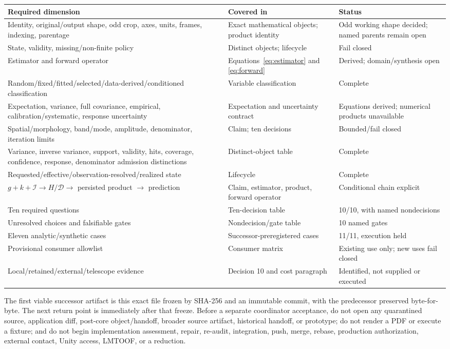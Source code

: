 \documentclass[11pt]{article}
\begin{document}
\begin{longtable}{@{}L{0.34\textwidth}L{0.23\textwidth}L{0.34\textwidth}@{}}
\toprule
Required dimension & Covered in & Status \\
\midrule
\endhead
Identity, original/output shape, odd crop, axes, units, frames, indexing,
parentage & Exact mathematical objects; product identity & Odd working shape
decided; named parents remain open \\
State, validity, missing/non-finite policy & Distinct objects; lifecycle &
Fail closed \\
Estimator and forward operator & Equations~\ref{eq:estimator} and
\ref{eq:forward} & Derived; domain/synthesis open \\
Random/fixed/fitted/selected/data-derived/conditioned classification & Variable
classification & Complete \\
Expectation, variance, full covariance, empirical, calibration/systematic,
response uncertainty & Expectation and uncertainty contract & Equations
derived; numerical products unavailable \\
Spatial/morphology, band/mode, amplitude, denominator, iteration limits & Claim;
ten decisions & Bounded/fail closed \\
Variance, inverse variance, support, validity, hits, coverage, confidence,
response, denominator admission distinctions & Distinct-object table &
Complete \\
Requested/effective/observation-resolved/realized state & Lifecycle & Complete \\
$g+k+\mathcal I\to H/\mathcal D\to$ persisted product $\to$ prediction & Claim,
estimator, product, forward operator & Conditional chain explicit \\
Ten required questions & Ten-decision table & 10/10, with named nondecisions \\
Unresolved choices and falsifiable gates & Nondecision/gate table & 10 named gates \\
Eleven analytic/synthetic cases & Successor-preregistered cases & 11/11,
execution held \\
Provisional consumer allowlist & Consumer matrix & Existing use only; new uses
fail closed \\
Local/retained/external/telescope evidence & Decision 10 and cost paragraph &
Identified, not supplied or executed \\
\bottomrule
\end{longtable}

The first viable successor artifact is this exact file frozen by SHA-256 and an
immutable commit, with the predecessor preserved byte-for-byte.  The next
return point is immediately after that freeze.  Before a
separate coordinator acceptance, do not open any quarantined source,
application diff, post-core object/handoff, broader source artifact,
historical handoff, or prototype; do not render a PDF or execute a fixture;
and do not begin implementation assessment, repair, re-audit, integration,
push, merge, rebase, production authorization, external contact, Unity access,
LMTOOF, or a reduction.
\end{document}
